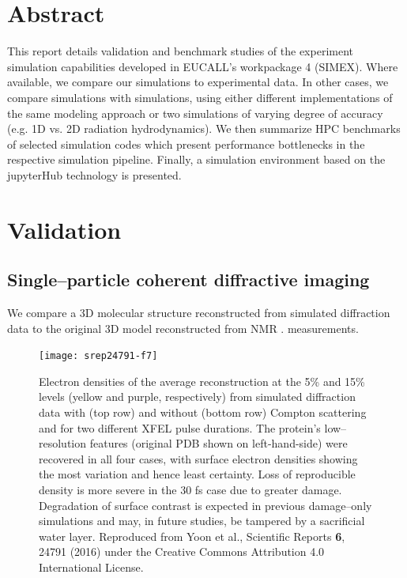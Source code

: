 \documentclass[10pt]{scrartcl}
\begin{document}
\section*{Abstract}
%
This report details validation and benchmark studies of the experiment simulation capabilities
developed in EUCALL's workpackage 4 (SIMEX). Where available, we compare our
simulations to experimental data. In other cases, we compare simulations with
simulations, using either different implementations of the same modeling
approach or two simulations of varying degree of accuracy (e.g. 1D vs. 2D
radiation hydrodynamics). We then summarize HPC benchmarks of selected
simulation codes which present performance bottlenecks in the respective
simulation pipeline. Finally, a simulation environment based on the jupyterHub
technology is presented.
%
\tableofcontents
%
\section{Validation}%
\subsection{Single--particle coherent diffractive imaging\label{sec:single_particle_imaging}}
We compare a 3D molecular structure reconstructed from simulated diffraction data
to the original 3D model reconstructed from NMR \cite{Schlessman1998}.
measurements.
%
\begin{figure}[ht]
  \begin{center}
    \texttt{[image: srep24791-f7]}
  \end{center}
  \caption{Electron densities of the average reconstruction at the 5\% and 15\%
    levels (yellow and purple, respectively) from simulated diffraction data with
    (top row) and without (bottom row) Compton scattering and for two different
    XFEL pulse durations. The protein's low--resolution features (original PDB
    shown on left-hand-side) were recovered in
    all four cases, with surface electron densities showing the most variation and
    hence least certainty. Loss of reproducible density is more severe in the
    30 fs case due to greater damage. Degradation of surface contrast is
    expected in
    previous damage--only simulations and may, in future studies, be tampered by a
    sacrificial water layer\cite{Hau-Riege2004}. Reproduced
    from Yoon et al., Scientific Reports \textbf{6}, 24791 (2016) under the
    Creative Commons Attribution 4.0 International License.
  }
  \label{fig:2NIP_reconstruction}
\end{figure}
\end{document}

